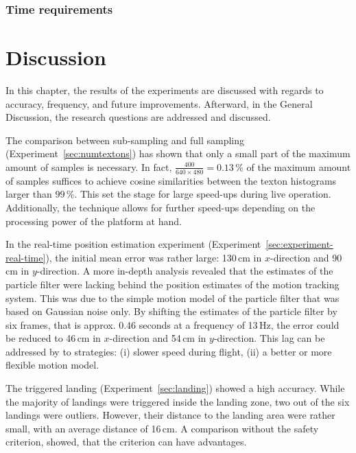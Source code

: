 \documentclass{report}
\begin{document}
\subsection{Time requirements}

\chapter{Discussion}
\label{chap:discussion}

In this chapter, the results of the experiments are discussed with
regards to accuracy, frequency, and future improvements. Afterward, in
the General Discussion, the research questions are addressed and
discussed.

The comparison between sub-sampling and full sampling
(Experiment~\ref{sec:numtextons}) has shown that only a small part of
the maximum amount of samples is necessary. In fact,
$\frac{400}{640 \times 480} = 0.13\,\%$ of the maximum amount of
samples suffices to achieve cosine similarities between the texton
histograms larger than $99\,\%$. This set the stage for large
speed-ups during live operation. Additionally, the technique allows
for further speed-ups depending on the processing power of the
platform at hand.

In the real-time position estimation experiment
(Experiment~\ref{sec:experiment-real-time}), the initial mean error
was rather large: 130\,cm in $x$-direction and 90\,cm in
$y$-direction. A more in-depth analysis revealed that the estimates of
the particle filter were lacking behind the position estimates of the
motion tracking system. This was due to the simple motion model of the
particle filter that was based on Gaussian noise only. By shifting the
estimates of the particle filter by six frames, that is approx. 0.46
seconds at a frequency of 13\,Hz, the error could be reduced to 46\,cm
in $x$-direction and 54\,cm in $y$-direction. This lag can be
addressed by to strategies: (i) slower speed during flight, (ii) a
better or more flexible motion model.

The triggered landing (Experiment~\ref{sec:landing}) showed a high
accuracy. While the majority of landings were triggered inside the
landing zone, two out of the six landings were outliers. However,
their distance to the landing area were rather small, with an average
distance of 16\,cm. A comparison without the safety criterion, showed,
that the criterion can have advantages.
\end{document}
